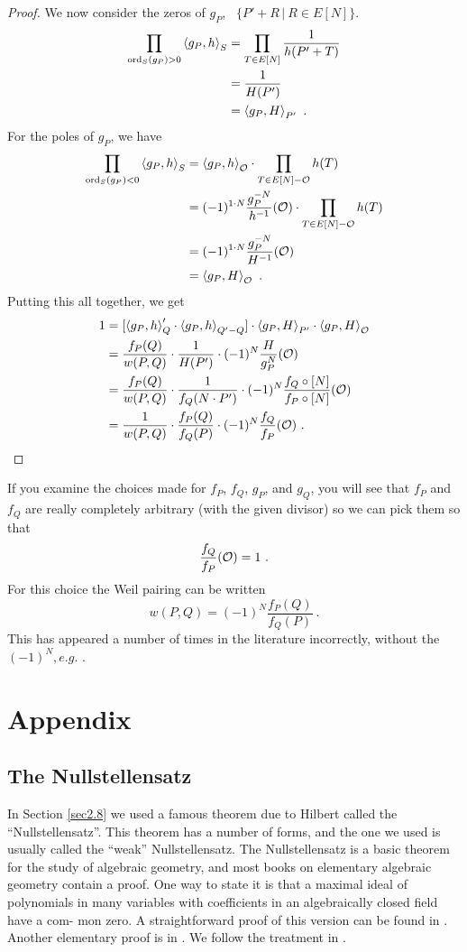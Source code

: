 \begin{proof}
We now consider the zeros of $g_{P}$, \ie\ $\{P' + R\, | \ R \in E[N]\}$.
\begin{align*}
\prod_{\operatorname{ord}_{S}(g_{P}) > 0} \left\langle g_{P},h \right \rangle_{S} &= \prod_{T\in E[N]}\frac{1}{h(P'+T)}\\
&=\frac{1}{H(P')}\\
&=\left\langle g_{P},H \right \rangle_{P'}\ .
\end{align*}
For the poles of $g_{P}$, we have
\begin{align*}
\prod_{\operatorname{ord}_{S}(g_{P}) < 0} \left\langle g_{P},h \right \rangle_{S}&=\left\langle g_{P},h \right \rangle_{\mathcal{O}} \cdot \prod_{T\in E[N]-\mathcal{O}}h(T)\\
&=(-1)^{1\cdot N}\frac{g_{P}^{-N}}{h^{-1}}(\mathcal{O})\cdot\prod_{T\in E[N]-\mathcal{O}}h(T)\\
&=(-1)^{1\cdot N}\frac{g_{P}^{-N}}{H^{-1}}(\mathcal{O})\\
&=\left\langle g_{P},H \right \rangle_{\mathcal{O}}\ .
\end{align*}
Putting this all together, we get
\begin{align*}
1&=[\left\langle g_{P},h \right \rangle_{Q}' \cdot \left\langle g_{P},h \right \rangle_{Q'-Q}] \cdot \left\langle g_{P},H \right \rangle_{P'} \cdot \left\langle g_{P},H \right \rangle_{\mathcal{O}}\\
&=\frac{f_{P}(Q)}{w(P,Q)} \cdot \frac{1}{H(P')} \cdot (-1)^{N}\frac{H}{g_{P}^{N}}(\mathcal{O})\\
&=\frac{f_{P}(Q)}{w(P,Q)} \cdot \frac{1}{f_{Q}(N \cdot P')} \cdot (-1)^{N}\frac{f_{Q}\circ[N]}{f_{P}\circ[N]}(\mathcal{O})\\
&=\frac{1}{w(P,Q)} \cdot \frac{f_{P}(Q)}{f_{Q}(P)} \cdot (-1)^{N}\frac{f_{Q}}{f_{P}}(\mathcal{O})\ .
\end{align*}
\end{proof}
If you examine the choices made for $f_{P}$, $f_{Q}$, $g_{P}$, and $g_{Q}$, you will see that $f_{P}$ and $f_{Q}$ are really completely arbitrary (with the given divisor) so we can pick them so that
$$
\frac{f_{Q}}{f_{P}}(\cuz)=1\ .
$$
For this choice the Weil pairing can be written
$$
w(P,Q)=(-1)^{N}\frac{f_{P}(Q)}{f_{Q}(P)}\ .
$$
This has appeared a number of times in the literature incorrectly, without the $(-1)^{N}, e.g.$ \cite{r2.8}.

\chapter{Appendix}

\section{The Nullstellensatz}

In Section \ref{sec2.8} we used a famous theorem due to Hilbert called the ``Nullstellensatz''. This theorem has a number of forms, and the one we used is usually called the ``weak'' Nullstellensatz. The Nullstellensatz is a basic theorem for the study of algebraic geometry, and most books on elementary algebraic geometry contain a proof. One way to state it is that a maximal ideal of polynomials in many variables with coefficients in an algebraically closed field have a com- mon zero. A straightforward proof of this version can be found in \cite{r2.9}. Another elementary proof is in \cite{r2.6}. We follow the treatment in \cite{r2.7}.

